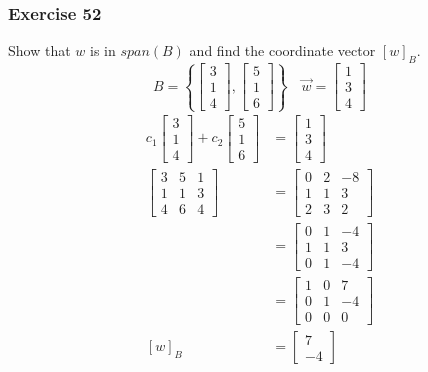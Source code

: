 \documentclass[letterpaper, 12pt]{math}
\begin{document}
\subsubsection*{Exercise 52}
Show that \( w \) is in \( span(B) \) and find the coordinate vector
\( [w]_B \).
\[ B = \left\{\begin{bmatrix}3 \\ 1 \\ 4\end{bmatrix},
  \begin{bmatrix}5 \\ 1 \\ 6\end{bmatrix}\right\} \quad
  \vec{w} = \begin{bmatrix}1 \\ 3 \\ 4\end{bmatrix} \]
\begin{align*}
  c_1\begin{bmatrix}3 \\ 1 \\ 4\end{bmatrix}+
    c_2\begin{bmatrix}5 \\ 1 \\ 6\end{bmatrix} &=
    \begin{bmatrix}1 \\ 3 \\ 4\end{bmatrix} \\
  \begin{bmatrix}
    3 & 5 & 1 \\
    1 & 1 & 3 \\
    4 & 6 & 4
  \end{bmatrix} &= \begin{bmatrix}
    0 & 2 & -8 \\
    1 & 1 & 3 \\
    2 & 3 & 2
  \end{bmatrix} \\
  &= \begin{bmatrix}
    0 & 1 & -4 \\
    1 & 1 & 3 \\
    0 & 1 & -4
  \end{bmatrix} \\
  &= \begin{bmatrix}
    1 & 0 & 7 \\
    0 & 1 & -4 \\
    0 & 0 & 0
  \end{bmatrix} \\
  [w]_B &= \begin{bmatrix}7 \\ -4\end{bmatrix}
\end{align*}
\end{document}
